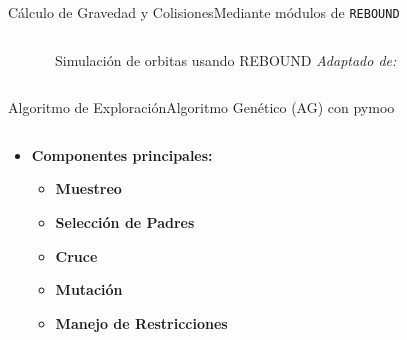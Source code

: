 \begin{frame}{Cálculo de Gravedad y Colisiones}{Mediante módulos de \texttt{REBOUND}}
\begin{columns}
\begin{column}{0.4\textwidth}
\begin{figure}[H]
{                }
                \vspace{-0.25cm}
                \caption{\tiny~Simulación de orbitas usando REBOUND \textit{Adaptado de:}~\cite{rebound_hyperbolic_orbits_2025}}%
                \label{fig:REBOUND_methods}
            \end{figure}
        \end{column}
    \end{columns}
\end{frame}

\begin{frame}{Algoritmo de Exploración}{Algoritmo Genético (AG) con pymoo}
    \begin{columns}
        \begin{column}{0.6\textwidth}
            \small
            \begin{itemize}
                \item \textbf{Componentes principales:}
                \begin{itemize}
                    \item \textbf{Muestreo}
                    \item \textbf{Selección de Padres}
                    \item \textbf{Cruce}
                    \item \textbf{Mutación}
                    \item \textbf{Manejo de Restricciones}
                \end{itemize}
            \end{itemize}
        \end{column}
        \begin{column}{0.4\textwidth}
            \centering
            \begin{figure}[H]
                \centering
\end{figure}
\end{column}
\end{columns}
\end{frame}
